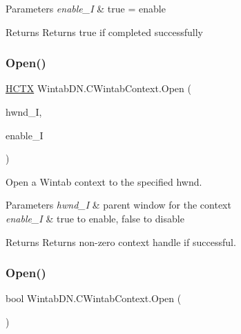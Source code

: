 \begin{DoxyParams}{Parameters}
{\em enable\+\_\+I} & true = enable\\
\hline
\end{DoxyParams}
\begin{DoxyReturn}{Returns}
Returns true if completed successfully
\end{DoxyReturn}
\mbox{\label{class_wintab_d_n_1_1_c_wintab_context_a4bb06f01ce05bcac01ed611ea7d241d8}} 
\subsubsection{\texorpdfstring{Open()}{Open()}\hspace{0.1cm}{\footnotesize\ttfamily [1/2]}}
{\footnotesize\ttfamily \mbox{\hyperlink{class_wintab_d_n_1_1_h_c_t_x}{H\+C\+TX}} Wintab\+D\+N.\+C\+Wintab\+Context.\+Open (\begin{DoxyParamCaption}\item[{\mbox{\hyperlink{struct_wintab_d_n_1_1_h_w_n_d}{H\+W\+ND}}}]{hwnd\+\_\+I,  }\item[{bool}]{enable\+\_\+I }\end{DoxyParamCaption})\hspace{0.3cm}{\ttfamily [inline]}}



Open a Wintab context to the specified hwnd. 


\begin{DoxyParams}{Parameters}
{\em hwnd\+\_\+I} & parent window for the context\\
\hline
{\em enable\+\_\+I} & true to enable, false to disable\\
\hline
\end{DoxyParams}
\begin{DoxyReturn}{Returns}
Returns non-\/zero context handle if successful.
\end{DoxyReturn}
\mbox{\label{class_wintab_d_n_1_1_c_wintab_context_a1522d857d00373971e9c0e010ae9e756}} 
\subsubsection{\texorpdfstring{Open()}{Open()}\hspace{0.1cm}{\footnotesize\ttfamily [2/2]}}
{\footnotesize\ttfamily bool Wintab\+D\+N.\+C\+Wintab\+Context.\+Open (\begin{DoxyParamCaption}{ }\end{DoxyParamCaption})\hspace{0.3cm}{\ttfamily [inline]}}



